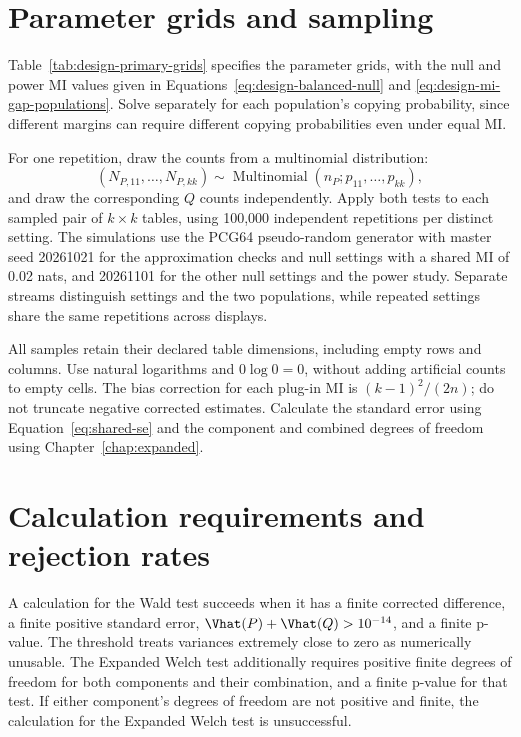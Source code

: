\section{Parameter grids and sampling}

Table~\ref{tab:design-primary-grids} specifies the parameter grids, with
the null and power MI values given in
Equations~\eqref{eq:design-balanced-null} and
\eqref{eq:design-mi-gap-populations}. Solve separately for each
population's copying probability, since different margins can require
different copying probabilities even under equal MI.

For one repetition, draw the counts from a multinomial distribution:
\begin{equation}
 (N_{P,11},\ldots,N_{P,kk})\sim\operatorname{Multinomial}
      (n_P;p_{11},\ldots,p_{kk}),
\end{equation}
and draw the corresponding \(Q\) counts independently. Apply both tests
to each sampled pair of \(k\times k\) tables, using 100,000 independent
repetitions per distinct setting. The simulations use the PCG64
pseudo-random generator with master seed 20261021 for the approximation
checks and null settings with a shared MI of 0.02 nats, and 20261101 for
the other null settings and the power study. Separate streams distinguish settings and
the two populations, while repeated settings share the same repetitions
across displays.

All samples retain their declared table dimensions, including empty rows
and columns. Use natural logarithms and \(0\log0=0\), without adding
artificial counts to empty cells.
The bias correction for each plug-in MI is \((k-1)^2/(2n)\); do not truncate
negative corrected estimates. Calculate the standard error using
Equation~\eqref{eq:shared-se} and the component and combined degrees of freedom
using Chapter~\ref{chap:expanded}.

\section{Calculation requirements and rejection rates}
\label{sec:validity-rules}

A calculation for the Wald test succeeds when it has a finite corrected difference, a
finite positive standard error, \(\Vhat(P)+\Vhat(Q)>10^{-14}\), and a finite p-value.
The threshold treats variances extremely close to zero as numerically
unusable. The Expanded Welch test additionally requires positive finite degrees
of freedom for both components and their combination, and a finite
p-value for that test. If either component's degrees of freedom are
not positive and finite, the calculation for the Expanded Welch test is unsuccessful.

